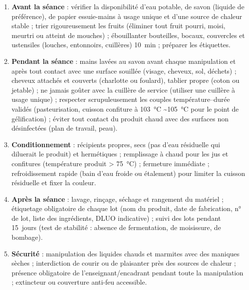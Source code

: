 \documentclass[11pt]{article}
\begin{document}
\begin{methode}
\begin{enumerate}
\item \textbf{Avant la séance} : vérifier la disponibilité d'eau potable, de savon (liquide de préférence), de papier essuie-mains à usage unique et d'une source de chaleur stable ; trier rigoureusement les fruits (éliminer tout fruit pourri, moisi, meurtri ou atteint de mouches) ; ébouillanter bouteilles, bocaux, couvercles et ustensiles (louches, entonnoirs, cuillères) \SI{10}{min} ; préparer les étiquettes.
\item \textbf{Pendant la séance} : mains lavées au savon avant chaque manipulation et après tout contact avec une surface souillée (visage, cheveux, sol, déchets) ; cheveux attachés et couverts (charlotte ou foulard), tablier propre (coton ou jetable) ; ne jamais goûter avec la cuillère de service (utiliser une cuillère à usage unique) ; respecter scrupuleusement les couples température--durée validés (pasteurisation, cuisson confiture à \SI{103}{\celsius} \textasciitilde \SI{105}{\celsius} pour le point de gélification) ; éviter tout contact du produit chaud avec des surfaces non désinfectées (plan de travail, peau).
\item \textbf{Conditionnement} : récipients propres, secs (pas d'eau résiduelle qui diluerait le produit) et hermétiques ; remplissage à chaud pour les jus et confitures (température produit \textgreater{} \SI{75}{\celsius}) ; fermeture immédiate ; refroidissement rapide (bain d'eau froide ou étalement) pour limiter la cuisson résiduelle et fixer la couleur.
\item \textbf{Après la séance} : lavage, rinçage, séchage et rangement du matériel ; étiquetage obligatoire de chaque lot (nom du produit, date de fabrication, n° de lot, liste des ingrédients, DLUO indicative) ; suivi des lots pendant \SI{15}{jours} (test de stabilité : absence de fermentation, de moisissure, de bombage).
\item \textbf{Sécurité} : manipulation des liquides chauds et marmites avec des maniques sèches ; interdiction de courir ou de plaisanter près des sources de chaleur ; présence obligatoire de l'enseignant/encadrant pendant toute la manipulation ; extincteur ou couverture anti-feu accessible.
\end{enumerate}
\end{methode}
\end{document}
